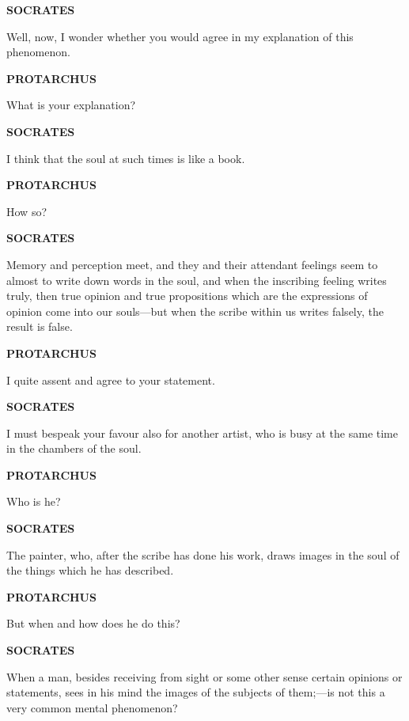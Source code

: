 \documentclass[11pt,letter]{article}
\begin{document}
\par \textbf{SOCRATES}
\par   Well, now, I wonder whether you would agree in my explanation of this phenomenon.

\par \textbf{PROTARCHUS}
\par   What is your explanation?

\par \textbf{SOCRATES}
\par   I think that the soul at such times is like a book.

\par \textbf{PROTARCHUS}
\par   How so?

\par \textbf{SOCRATES}
\par   Memory and perception meet, and they and their attendant feelings seem to almost to write down words in the soul, and when the inscribing feeling writes truly, then true opinion and true propositions which are the expressions of opinion come into our souls—but when the scribe within us writes falsely, the result is false.

\par \textbf{PROTARCHUS}
\par   I quite assent and agree to your statement.

\par \textbf{SOCRATES}
\par   I must bespeak your favour also for another artist, who is busy at the same time in the chambers of the soul.

\par \textbf{PROTARCHUS}
\par   Who is he?

\par \textbf{SOCRATES}
\par   The painter, who, after the scribe has done his work, draws images in the soul of the things which he has described.

\par \textbf{PROTARCHUS}
\par   But when and how does he do this?

\par \textbf{SOCRATES}
\par   When a man, besides receiving from sight or some other sense certain opinions or statements, sees in his mind the images of the subjects of them;—is not this a very common mental phenomenon?
\end{document}

